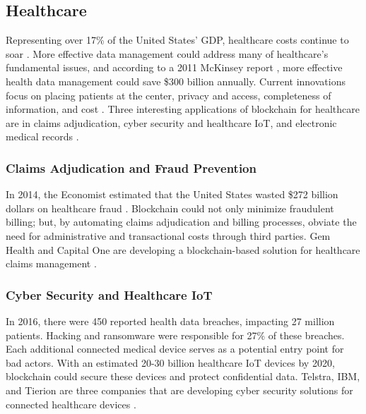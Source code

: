 \documentclass[sigconf]{acmart}
\begin{document}
\subsection{Healthcare}
Representing over 17\% of the United States' GDP, healthcare costs continue to soar \cite{hitchingHealthcare}. More effective data management could address many of healthcare's fundamental issues, and according to a 2011 McKinsey report \cite{mckinsey2011}, more effective health data management could save \$300 billion annually. Current innovations focus on placing patients at the center, privacy and access, completeness of information, and cost \cite{hitchingHealthcare}. Three interesting applications of blockchain for healthcare are in claims adjudication, cyber security and healthcare IoT, and electronic medical records \cite{das2017}.

\subsubsection{Claims Adjudication and Fraud Prevention}
In 2014, the Economist estimated that the United States wasted \$272 billion dollars on healthcare fraud \cite{economist2014}. Blockchain could not only minimize fraudulent billing; but, by automating claims adjudication and billing processes, obviate the need for administrative and transactional costs through third parties. Gem Health and Capital One are developing a blockchain-based solution for healthcare claims management \cite{das2017}.

\subsubsection{Cyber Security and Healthcare IoT}
In 2016, there were 450 reported health data breaches, impacting 27 million patients. Hacking and ransomware were responsible for 27\% of these breaches. Each additional connected medical device serves as a potential entry point for bad actors. With an estimated 20-30 billion healthcare IoT devices by 2020, blockchain could secure these devices and protect confidential data. Telstra, IBM, and Tierion are three companies that are developing cyber security solutions for connected healthcare devices \cite{das2017}.
\end{document}

